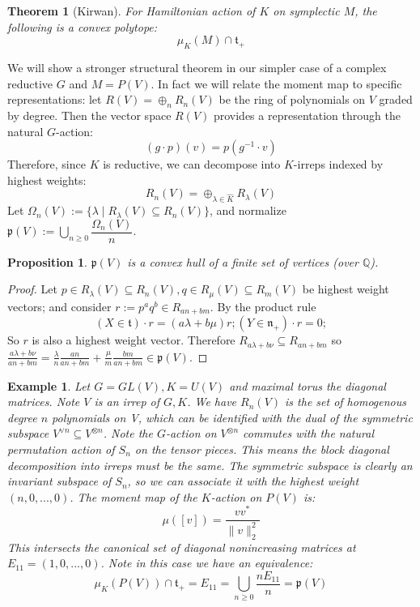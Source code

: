 \documentclass{article}
\newtheorem{theorem}{Theorem}
\newtheorem{prop}{Proposition}
\newtheorem{example}{Example}
\newcommand{\Q}{{\mathbb{Q}}}
\begin{document}
\begin{theorem} [Kirwan]
For Hamiltonian action of $K$ on symplectic $M$, the following is a convex polytope: 
\[ \mu_{K}(M) \cap \mathfrak{t}_{+} \]
\end{theorem}

We will show a stronger structural theorem in our simpler case of a complex reductive $G$ and $M = P(V)$. In fact we will relate the moment map to specific representations: let $R(V) = \oplus_{n} R_{n}(V)$ be the ring of polynomials on $V$ graded by degree. Then the vector space $R(V)$ provides a representation through the natural $G$-action:
\[ (g \cdot p)(v) = p(g^{-1} \cdot v)  \]
Therefore, since $K$ is reductive, we can decompose into $K$-irreps indexed by highest weights:
\[ R_{n}(V) = \oplus_{\lambda \in \hat{K}} R_{\lambda}(V)   \]
Let $\Omega_{n}(V) := \{\lambda \mid R_{\lambda}(V) \subseteq R_{n}(V) \}$, and normalize $\mathfrak{p}(V) := \bigcup_{n \geq 0} \dfrac{\Omega_{n}(V)}{n}$.

\begin{prop}
$\mathfrak{p}(V)$ is a convex hull of a finite set of vertices (over $\Q$). 
\end{prop}
\begin{proof}
Let $p \in R_{\lambda}(V) \subseteq R_{n}(V), q \in R_{\mu}(V) \subseteq R_{m}(V)$ be highest weight vectors; and consider $r := p^{a} q^{b} \in R_{an + bm}$. By the product rule
\[ (X \in \mathfrak{t}) \cdot r = (a \lambda + b \mu) r; (Y \in \mathfrak{n}_{+}) \cdot r = 0;   \]
So $r$ is also a highest weight vector. Therefore $R_{a \lambda + b \nu} \subseteq R_{an + bm}$ so $\frac{a \lambda + b \nu}{an + bm} = \frac{\lambda}{n} \frac{an}{an + bm} + \frac{\mu}{m} \frac{bm}{an+bm} \in \mathfrak{p}(V)$. 
\end{proof}

\begin{example}
Let $G = GL(V), K = U(V)$ and maximal torus the diagonal matrices. Note $V$ is an irrep of $G,K$. We have $R_{n}(V)$ is the set of homogenous degree $n$ polynomials on V, which can be identified with the dual of the symmetric subspace $V^{\vee n} \subseteq V^{\otimes n}$. Note the $G$-action on $V^{\otimes n}$ commutes with the natural permutation action of $S_{n}$ on the tensor pieces. This means the block diagonal decomposition into irreps must be the same. The symmetric subspace is clearly an invariant subspace of $S_{n}$, so we can associate it with the highest weight $(n, 0, ..., 0)$. The moment map of the $K$-action on $P(V)$ is:
\[ \mu([v]) = \frac{v v^{*}}{\|v\|_{2}^{2}}  \]
This intersects the canonical set of diagonal nonincreasing matrices at $E_{11} = (1,0, ...,0)$. Note in this case we have an equivalence:
\[ \mu_{K}(P(V)) \cap \mathfrak{t}_{+} = E_{11} = \bigcup_{n \geq 0} \frac{n E_{11}}{n} = \mathfrak{p}(V)    \]
\end{example}
\end{document}
